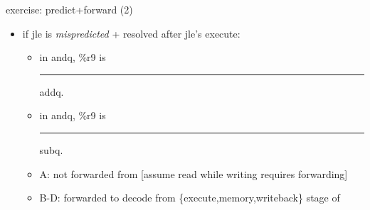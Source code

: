 \begin{frame}[fragile,label=forwardPathsPredict2]{exercise: predict+forward (2)}
\vspace{-.5cm}
\begin{itemize}
\item if jle is \textit{mispredicted} + resolved after jle's execute:
\begin{itemize}
    \item in andq, \%r9 is \rule{3cm}{2pt} addq.
    \item in andq, \%r9 is \rule{3cm}{2pt} subq.
\end{itemize}
\vspace{-.15cm}
    \begin{itemize}
    \item A: not forwarded from [assume read while writing requires forwarding]
    \item B-D: forwarded to decode from \{execute,memory,writeback\} stage of
    \end{itemize}
\end{itemize}
\end{frame}
